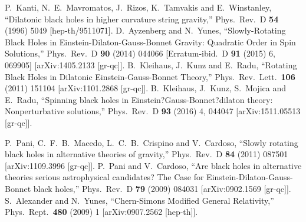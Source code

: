 \documentclass{article}
\numberwithin{equation}{section}
\begin{document}
\begin{small}
\begin{thebibliography}{99}
  P.~Kanti, N.~E.~Mavromatos, J.~Rizos, K.~Tamvakis and E.~Winstanley,
  ``Dilatonic black holes in higher curvature string gravity,''
  Phys.\ Rev.\ D {\bf 54} (1996) 5049
  [hep-th/9511071].
  D.~Ayzenberg and N.~Yunes,
  ``Slowly-Rotating Black Holes in Einstein-Dilaton-Gauss-Bonnet Gravity: Quadratic Order in Spin Solutions,''
  Phys.\ Rev.\ D {\bf 90} (2014) 044066
   [Erratum-ibid.\ D {\bf 91} (2015) 6,  069905]
  [arXiv:1405.2133 [gr-qc]].
  B.~Kleihaus, J.~Kunz and E.~Radu,
  ``Rotating Black Holes in Dilatonic Einstein-Gauss-Bonnet Theory,''
  Phys.\ Rev.\ Lett.\  {\bf 106} (2011) 151104
  [arXiv:1101.2868 [gr-qc]].
  B.~Kleihaus, J.~Kunz, S.~Mojica and E.~Radu,
  ``Spinning black holes in Einstein?Gauss-Bonnet?dilaton theory: Nonperturbative solutions,''
  Phys.\ Rev.\ D {\bf 93} (2016) 4,  044047
  [arXiv:1511.05513 [gr-qc]].

  P.~Pani, C.~F.~B.~Macedo, L.~C.~B.~Crispino and V.~Cardoso,
  ``Slowly rotating black holes in alternative theories of gravity,''
  Phys.\ Rev.\ D {\bf 84} (2011) 087501
  [arXiv:1109.3996 [gr-qc]].
  P.~Pani and V.~Cardoso,
  ``Are black holes in alternative theories serious astrophysical candidates? The Case for Einstein-Dilaton-Gauss-Bonnet black holes,''
  Phys.\ Rev.\ D {\bf 79} (2009) 084031
  [arXiv:0902.1569 [gr-qc]].
  S.~Alexander and N.~Yunes,
  ``Chern-Simons Modified General Relativity,''
  Phys.\ Rept.\  {\bf 480} (2009) 1
  [arXiv:0907.2562 [hep-th]].


\end{thebibliography}
\end{small}
\end{document}
